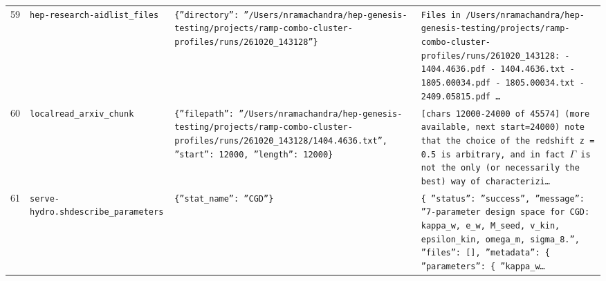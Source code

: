 \documentclass[11pt,a4paper]{article}
\begin{document}
\begin{longtable}{@{}p{}p{}p{}p{}@{}}
59 & \texttt{hep-research-aid}\newline\texttt{list\_\allowbreak{}files} & \texttt{\{''directory'':\allowbreak{} ''/\allowbreak{}Users/\allowbreak{}nramachandra/\allowbreak{}hep-genesis-testing/\allowbreak{}projects/\allowbreak{}ramp-combo-cluster-profiles/\allowbreak{}runs/\allowbreak{}261020\_\allowbreak{}143128''\}\allowbreak{}} & \texttt{Files in /\allowbreak{}Users/\allowbreak{}nramachandra/\allowbreak{}hep-genesis-testing/\allowbreak{}projects/\allowbreak{}ramp-combo-cluster-profiles/\allowbreak{}runs/\allowbreak{}261020\_\allowbreak{}143128:\allowbreak{}   - 1404.4636.pdf   - 1404.4636.txt   - 1805.00034.pdf   - 1805.00034.txt   - 2409.05815.pdf  \ldots{}\allowbreak{}} \\
60 & \texttt{local}\newline\texttt{read\_\allowbreak{}arxiv\_\allowbreak{}chunk} & \texttt{\{''filepath'':\allowbreak{} ''/\allowbreak{}Users/\allowbreak{}nramachandra/\allowbreak{}hep-genesis-testing/\allowbreak{}projects/\allowbreak{}ramp-combo-cluster-profiles/\allowbreak{}runs/\allowbreak{}261020\_\allowbreak{}143128/\allowbreak{}1404.4636.txt'',\allowbreak{} ''start'':\allowbreak{} 12000,\allowbreak{} ''length'':\allowbreak{} 12000\}\allowbreak{}} & \texttt{[chars 12000-24000 of 45574]\allowbreak{} (more available,\allowbreak{} next start=\allowbreak{}24000)\allowbreak{}   note that the choice of the redshift z =\allowbreak{} 0.5 is arbitrary,\allowbreak{} and in fact $\Gamma$ is not the only (or necessarily the best)\allowbreak{} way of characterizi\ldots{}\allowbreak{}} \\
61 & \texttt{serve-hydro.sh}\newline\texttt{describe\_\allowbreak{}parameters} & \texttt{\{''stat\_\allowbreak{}name'':\allowbreak{} ''CGD''\}\allowbreak{}} & \texttt{\{   ''status'':\allowbreak{} ''success'',\allowbreak{}   ''message'':\allowbreak{} ''7-parameter design space for CGD:\allowbreak{} kappa\_\allowbreak{}w,\allowbreak{} e\_\allowbreak{}w,\allowbreak{} M\_\allowbreak{}seed,\allowbreak{} v\_\allowbreak{}kin,\allowbreak{} epsilon\_\allowbreak{}kin,\allowbreak{} omega\_\allowbreak{}m,\allowbreak{} sigma\_\allowbreak{}8.'',\allowbreak{}   ''files'':\allowbreak{} []\allowbreak{},\allowbreak{}   ''metadata'':\allowbreak{} \{     ''parameters'':\allowbreak{} \{       ''kappa\_\allowbreak{}w\ldots{}\allowbreak{}} \\

\end{longtable}
\end{document}
